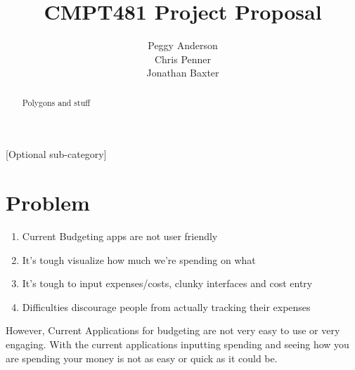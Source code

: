 \documentclass{chi2011}
\begin{document}
\setlength{\paperheight}{11in}
\setlength{\paperwidth}{8.5in}
\setlength{\pdfpageheight}{\paperheight}
\setlength{\pdfpagewidth}{\paperwidth}


\title{CMPT481 Project Proposal}
\author{
\alignauthor Peggy Anderson\\
    \alignauthor Chris Penner\\
    \alignauthor Jonathan Baxter\\
}


\maketitle

\begin{abstract}
    Polygons and stuff
\end{abstract}

[Optional sub-category]


\section{Problem}

\begin{enumerate}
    \item Current Budgeting apps are not user friendly
    \item It's tough visualize how much we're spending on what
    \item It's tough to input expenses/costs, clunky interfaces and cost entry
    \item Difficulties discourage people from actually tracking their expenses
\end{enumerate}
 However, Current Applications for budgeting are not very easy to use or very
 engaging. With the current applications inputting spending and seeing how you
 are spending your money is not as easy or quick as it could be.  
\end{document}
